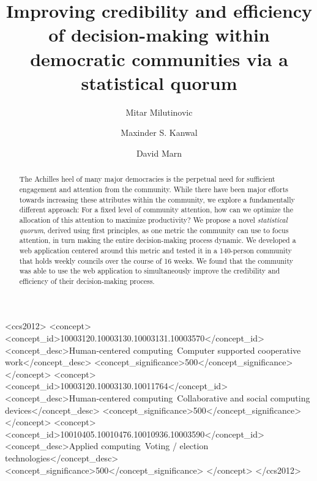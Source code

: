 \documentclass[format=acmsmall, review=true, screen=true, anonymous=true]{acmart}
\begin{document}
\title{Improving credibility and efficiency of decision-making within democratic communities via a statistical quorum}

\author{Mitar Milutinovic}
\author{Maxinder S. Kanwal}
\author{David Marn}


\begin{abstract}
The Achilles heel of many major democracies is the perpetual need for sufficient engagement and attention from the community. While there have been major efforts towards increasing these attributes within the community, we explore a fundamentally different approach: For a fixed level of community attention, how can we optimize the allocation of this attention to maximize productivity? We propose a novel \textit{statistical quorum}, derived using first principles, as one metric the community can use to focus attention, in turn making the entire decision-making process dynamic. We developed a web application centered around this metric and tested it in a 140-person community that holds weekly councils over the course of 16 weeks. We found that the community was able to use the web application to simultaneously improve the credibility and efficiency of their decision-making process.
\end{abstract}


%
%
\begin{CCSXML}
<ccs2012>
<concept>
<concept_id>10003120.10003130.10003131.10003570</concept_id>
<concept_desc>Human-centered computing~Computer supported cooperative work</concept_desc>
<concept_significance>500</concept_significance>
</concept>
<concept>
<concept_id>10003120.10003130.10011764</concept_id>
<concept_desc>Human-centered computing~Collaborative and social computing devices</concept_desc>
<concept_significance>500</concept_significance>
</concept>
<concept>
<concept_id>10010405.10010476.10010936.10003590</concept_id>
<concept_desc>Applied computing~Voting / election technologies</concept_desc>
<concept_significance>500</concept_significance>
</concept>
</ccs2012>
\end{CCSXML}

\end{document}
